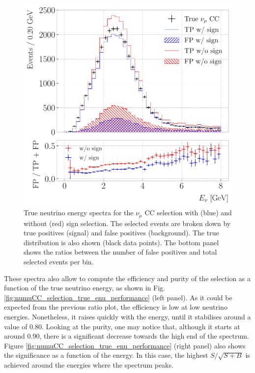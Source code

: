 \begin{figure}[t]
	\centering
	\includegraphics[width=.80\linewidth]{Images/GAr_selection/numuCC_selection_true_energy_sign_comp.pdf}
	\caption{True neutrino energy spectra for the $\nu_{\mu}$ CC selection with (blue) and without (red) sign selection. The selected events are broken down by true positives (signal) and false positives (background). The true distribution is also shown (black data points). The bottom panel shows the ratios between the number of false positives and total selected events per bin.}
	\label{fig:numuCC_sign_selection}
\end{figure}

These spectra also allow to compute the efficiency and purity of the selection as a function of the true neutrino energy, as shown in Fig. \ref{fig:numuCC_selection_true_enu_performance} (left panel). As it could be expected from the previous ratio plot, the efficiency is low at low neutrino energies. Nonetheless, it raises quickly with the energy, until it stabilises around a value of $0.80$. Looking at the purity, one may notice that, although it starts at around $0.90$, there is a significant decrease towards the high end of the spectrum. Figure \ref{fig:numuCC_selection_true_enu_performance} (right panel) also shows the significance as a function of the energy. In this case, the highest $S/\sqrt{S+B}$ is achieved around the energies where the spectrum peaks.

